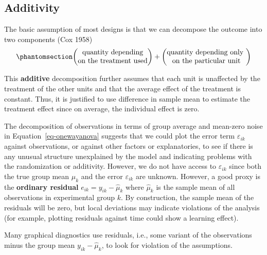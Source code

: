 \documentclass[
  11pt,
  letterpaper,
]{scrbook}
\theoremstyle{definition}
\theoremstyle{definition}
\theoremstyle{remark}
\begin{document}
\subsection{Additivity}\label{additivity}

The basic assumption of most designs is that we can decompose the
outcome into two components (Cox 1958)
\begin{equation}\phantomsection\label{eq-additivefn}{
\begin{pmatrix} \text{quantity depending} \\
 \text{on the treatment used}\end{pmatrix} +
 \begin{pmatrix} \text{quantity depending only } \\
\text{on the particular unit} 
\end{pmatrix}
}\end{equation}

This \textbf{additive} decomposition further assumes that each unit is
unaffected by the treatment of the other units and that the average
effect of the treatment is constant. Thus, it is justified to use
difference in sample mean to estimate the treatment effect since on
average, the individual effect is zero.

The decomposition of observations in terms of group average and
mean-zero noise in Equation~\ref{eq-onewayanova} suggests that we could
plot the error term \(\varepsilon_{ik}\) against observations, or
against other factors or explanatories, to see if there is any unusual
structure unexplained by the model and indicating problems with the
randomization or additivity. However, we do not have access to
\(\varepsilon_{ik}\) since both the true group mean \(\mu_k\) and the
error \(\varepsilon_{ik}\) are unknown. However, a good proxy is the
\textbf{ordinary residual} \(e_{ik} = y_{ik} - \widehat{\mu}_k\) where
\(\widehat{\mu}_k\) is the sample mean of all observations in
experimental group \(k\). By construction, the sample mean of the
residuals will be zero, but local deviations may indicate violations of
the analysis (for example, plotting residuals against time could show a
learning effect).

Many graphical diagnostics use residuals, i.e., some variant of the
observations minus the group mean \(y_{ik} - \widehat{\mu}_k\), to look
for violation of the assumptions.
\end{document}
